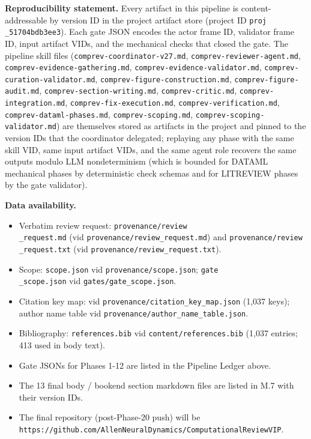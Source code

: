\documentclass[11pt]{article}
\begin{document}
\textbf{Reproducibility statement.} Every artifact in this pipeline is content-addressable by version ID in the project artifact store (project ID \texttt{proj\\_51704bdb3ee3}). Each gate JSON encodes the actor frame ID, validator frame ID, input artifact VIDs, and the mechanical checks that closed the gate. The pipeline skill files (\texttt{comprev-coordinator-v27.md}, \texttt{comprev-reviewer-agent.md}, \texttt{comprev-evidence-gathering.md}, \texttt{comprev-evidence-validator.md}, \texttt{comprev-curation-validator.md}, \texttt{comprev-figure-construction.md}, \texttt{comprev-figure-audit.md}, \texttt{comprev-section-writing.md}, \texttt{comprev-critic.md}, \texttt{comprev-integration.md}, \texttt{comprev-fix-execution.md}, \texttt{comprev-verification.md}, \texttt{comprev-dataml-phases.md}, \texttt{comprev-scoping.md}, \texttt{comprev-scoping-validator.md}) are themselves stored as artifacts in the project and pinned to the version IDs that the coordinator delegated; replaying any phase with the same skill VID, same input artifact VIDs, and the same agent role recovers the same outputs modulo LLM nondeterminism (which is bounded for DATAML mechanical phases by deterministic check schemas and for LITREVIEW phases by the gate validator).

\textbf{Data availability.}

\begin{itemize}
\item Verbatim review request: \texttt{provenance/review\\_request.md} (vid \texttt{provenance/review\_request.md}) and \texttt{provenance/review\\_request.txt} (vid \texttt{provenance/review\_request.txt}).
\item Scope: \texttt{scope.json} vid \texttt{provenance/scope.json}; \texttt{gate\\_scope.json} vid \texttt{gates/gate\_scope.json}.
\item Citation key map: vid \texttt{provenance/citation\_key\_map.json} (1,037 keys); author name table vid \texttt{provenance/author\_name\_table.json}.
\item Bibliography: \texttt{references.bib} vid \texttt{content/references.bib} (1,037 entries; 413 used in body text).
\item Gate JSONs for Phases 1-12 are listed in the Pipeline Ledger above.
\item The 13 final body / bookend section markdown files are listed in M.7 with their version IDs.
\item The final repository (post-Phase-20 push) will be \texttt{https://github.com/AllenNeuralDynamics/ComputationalReviewVIP}.
\end{itemize}
\end{document}
